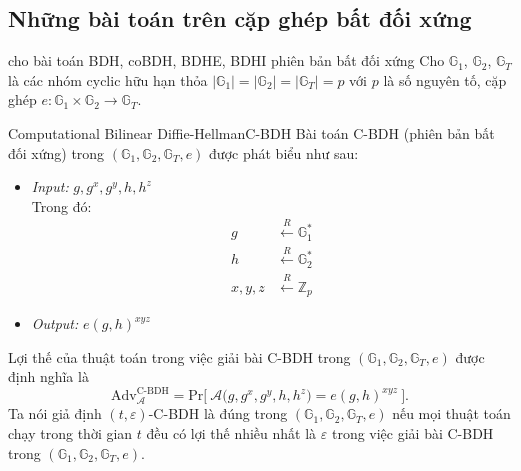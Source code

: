 \documentclass[class=report, crop=false]{standalone}
\begin{document}
		\subsection{Những bài toán trên cặp ghép bất đối xứng}
			\begin{supposition}{cho bài toán BDH, coBDH, BDHE, BDHI phiên bản bất đối xứng}
				Cho $\mathbb{G}_1$, $\mathbb{G}_2$, $\mathbb{G}_T$ là các nhóm cyclic hữu hạn thỏa $|\mathbb{G}_1| = |\mathbb{G}_2| = |\mathbb{G}_T| = p$ với $p$ là số nguyên tố, cặp ghép $e: \mathbb{G}_1 \times \mathbb{G}_2 \rightarrow \mathbb{G}_T$.
			\end{supposition}
			\begin{problem}{Computational Bilinear Diffie-Hellman}{C-BDH}
				Bài toán C-BDH (phiên bản bất đối xứng) trong $(\mathbb{G}_1, \mathbb{G}_2, \mathbb{G}_T, e)$ được phát biểu như sau:
				\vspace{-\baselineskip}
				\begin{itemize}[leftmargin=1.5cm, itemindent=-0.5cm]
					\item[] \textit{Input:} $g, g^x, g^y, h, h^z$ \\
					Trong đó: \vspace{-\baselineskip}
					\begin{align*}
						g 			&\xleftarrow{R} \mathbb{G}_1^* \\
						h 			&\xleftarrow{R} \mathbb{G}_2^* \\
						x, y, z 	&\xleftarrow{R} \mathbb{Z}_p
					\end{align*}
					\item[] \textit{Output:} $e(g, h)^{xyz}$
				\end{itemize}
				\vspace{-\baselineskip}\par
				Lợi thế của thuật toán \algo trong việc giải bài C-BDH trong $(\mathbb{G}_1, \mathbb{G}_2, \mathbb{G}_T, e)$ được định nghĩa là
				\[
					\text{Adv}_{\mathcal{A}}^{\text{C-BDH}} = \text{Pr}\bigg[ \ \mathcal{A}\Big(g, g^x, g^y, h, h^z \Big) = e(g, h)^{xyz} \ \bigg].
				\] \indent
				Ta nói giả định $(t, \varepsilon)$-C-BDH là đúng trong $(\mathbb{G}_1, \mathbb{G}_2, \mathbb{G}_T, e)$ nếu mọi thuật toán chạy trong thời gian $t$ đều có lợi thế nhiều nhất là $\varepsilon$ trong việc giải bài C-BDH trong $(\mathbb{G}_1, \mathbb{G}_2, \mathbb{G}_T, e)$.
			\end{problem}
\end{document}
